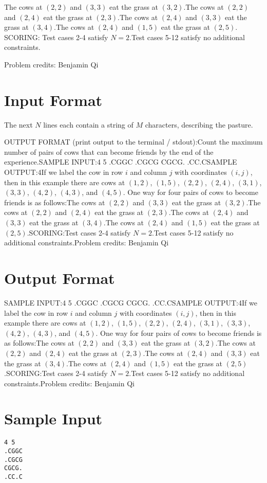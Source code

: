 \documentclass[12pt]{article}
\begin{document}
The cows at $(2,2)$ and $(3,3)$ eat the grass at $(3,2)$.The cows at $(2,2)$ and $(2,4)$ eat the grass at $(2,3)$.The cows at $(2,4)$ and $(3,3)$ eat the grass at $(3,4)$.The cows at $(2,4)$ and $(1,5)$ eat the grass at $(2,5)$.
SCORING:
Test cases 2-4 satisfy $N=2$.Test cases 5-12 satisfy no additional constraints.


Problem credits: Benjamin Qi



\section*{Input Format}
The next $N$ lines each contain a string of $M$ characters, describing the pasture.

OUTPUT FORMAT (print output to the terminal / stdout):Count the maximum number of pairs of cows that can become friends by the end
of the experience.SAMPLE INPUT:4 5
.CGGC
.CGCG
CGCG.
.CC.CSAMPLE OUTPUT:4If we label the cow in row $i$ and column $j$ with coordinates $(i,j)$, then in
this example there are cows at $(1,2)$, $(1,5)$, $(2,2)$, $(2,4)$, $(3,1)$, $(3,3)$, $(4,2)$,
$(4,3)$, and $(4,5)$. One way for four pairs of cows to become friends is as
follows:The cows at $(2,2)$ and $(3,3)$ eat the grass at $(3,2)$.The cows at $(2,2)$ and $(2,4)$ eat the grass at $(2,3)$.The cows at $(2,4)$ and $(3,3)$ eat the grass at $(3,4)$.The cows at $(2,4)$ and $(1,5)$ eat the grass at $(2,5)$.SCORING:Test cases 2-4 satisfy $N=2$.Test cases 5-12 satisfy no additional constraints.Problem credits: Benjamin Qi

\section*{Output Format}
SAMPLE INPUT:4 5
.CGGC
.CGCG
CGCG.
.CC.CSAMPLE OUTPUT:4If we label the cow in row $i$ and column $j$ with coordinates $(i,j)$, then in
this example there are cows at $(1,2)$, $(1,5)$, $(2,2)$, $(2,4)$, $(3,1)$, $(3,3)$, $(4,2)$,
$(4,3)$, and $(4,5)$. One way for four pairs of cows to become friends is as
follows:The cows at $(2,2)$ and $(3,3)$ eat the grass at $(3,2)$.The cows at $(2,2)$ and $(2,4)$ eat the grass at $(2,3)$.The cows at $(2,4)$ and $(3,3)$ eat the grass at $(3,4)$.The cows at $(2,4)$ and $(1,5)$ eat the grass at $(2,5)$.SCORING:Test cases 2-4 satisfy $N=2$.Test cases 5-12 satisfy no additional constraints.Problem credits: Benjamin Qi

\section*{Sample Input}
\begin{verbatim}
4 5
.CGGC
.CGCG
CGCG.
.CC.C
\end{verbatim}
\end{document}
